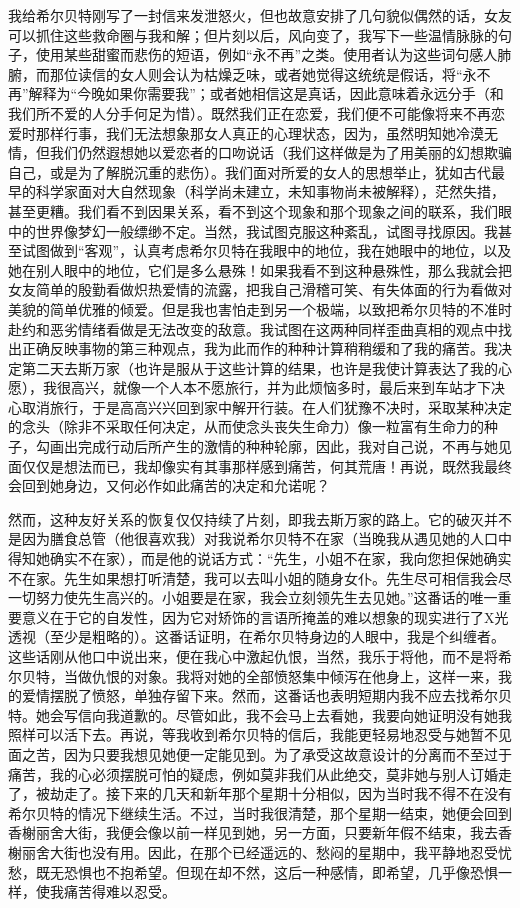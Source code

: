 \par 我给希尔贝特刚写了一封信来发泄怒火，但也故意安排了几句貌似偶然的话，女友可以抓住这些救命圈与我和解；但片刻以后，风向变了，我写下一些温情脉脉的句子，使用某些甜蜜而悲伤的短语，例如“永不再”之类。使用者认为这些词句感人肺腑，而那位读信的女人则会认为枯燥乏味，或者她觉得这统统是假话，将“永不再”解释为“今晚如果你需要我”；或者她相信这是真话，因此意味着永远分手（和我们所不爱的人分手何足为惜）。既然我们正在恋爱，我们便不可能像将来不再恋爱时那样行事，我们无法想象那女人真正的心理状态，因为，虽然明知她冷漠无情，但我们仍然遐想她以爱恋者的口吻说话（我们这样做是为了用美丽的幻想欺骗自己，或是为了解脱沉重的悲伤）。我们面对所爱的女人的思想举止，犹如古代最早的科学家面对大自然现象（科学尚未建立，未知事物尚未被解释），茫然失措，甚至更糟。我们看不到因果关系，看不到这个现象和那个现象之间的联系，我们眼中的世界像梦幻一般缥缈不定。当然，我试图克服这种紊乱，试图寻找原因。我甚至试图做到“客观”，认真考虑希尔贝特在我眼中的地位，我在她眼中的地位，以及她在别人眼中的地位，它们是多么悬殊！如果我看不到这种悬殊性，那么我就会把女友简单的殷勤看做炽热爱情的流露，把我自己滑稽可笑、有失体面的行为看做对美貌的简单优雅的倾爱。但是我也害怕走到另一个极端，以致把希尔贝特的不准时赴约和恶劣情绪看做是无法改变的敌意。我试图在这两种同样歪曲真相的观点中找出正确反映事物的第三种观点，我为此而作的种种计算稍稍缓和了我的痛苦。我决定第二天去斯万家（也许是服从于这些计算的结果，也许是我使计算表达了我的心愿），我很高兴，就像一个人本不愿旅行，并为此烦恼多时，最后来到车站才下决心取消旅行，于是高高兴兴回到家中解开行装。在人们犹豫不决时，采取某种决定的念头（除非不采取任何决定，从而使念头丧失生命力）像一粒富有生命力的种子，勾画出完成行动后所产生的激情的种种轮廓，因此，我对自己说，不再与她见面仅仅是想法而已，我却像实有其事那样感到痛苦，何其荒唐！再说，既然我最终会回到她身边，又何必作如此痛苦的决定和允诺呢？
\par 然而，这种友好关系的恢复仅仅持续了片刻，即我去斯万家的路上。它的破灭并不是因为膳食总管（他很喜欢我）对我说希尔贝特不在家（当晚我从遇见她的人口中得知她确实不在家），而是他的说话方式：“先生，小姐不在家，我向您担保她确实不在家。先生如果想打听清楚，我可以去叫小姐的随身女仆。先生尽可相信我会尽一切努力使先生高兴的。小姐要是在家，我会立刻领先生去见她。”这番话的唯一重要意义在于它的自发性，因为它对矫饰的言语所掩盖的难以想象的现实进行了X光透视（至少是粗略的）。这番话证明，在希尔贝特身边的人眼中，我是个纠缠者。这些话刚从他口中说出来，便在我心中激起仇恨，当然，我乐于将他，而不是将希尔贝特，当做仇恨的对象。我将对她的全部愤怒集中倾泻在他身上，这样一来，我的爱情摆脱了愤怒，单独存留下来。然而，这番话也表明短期内我不应去找希尔贝特。她会写信向我道歉的。尽管如此，我不会马上去看她，我要向她证明没有她我照样可以活下去。再说，等我收到希尔贝特的信后，我能更轻易地忍受与她暂不见面之苦，因为只要我想见她便一定能见到。为了承受这故意设计的分离而不至过于痛苦，我的心必须摆脱可怕的疑虑，例如莫非我们从此绝交，莫非她与别人订婚走了，被劫走了。接下来的几天和新年那个星期十分相似，因为当时我不得不在没有希尔贝特的情况下继续生活。不过，当时我很清楚，那个星期一结束，她便会回到香榭丽舍大街，我便会像以前一样见到她，另一方面，只要新年假不结束，我去香榭丽舍大街也没有用。因此，在那个已经遥远的、愁闷的星期中，我平静地忍受忧愁，既无恐惧也不抱希望。但现在却不然，这后一种感情，即希望，几乎像恐惧一样，使我痛苦得难以忍受。
